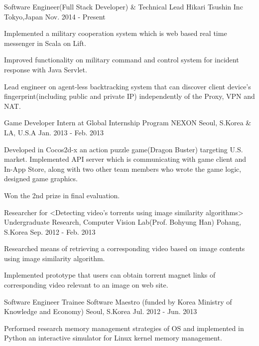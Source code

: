 \begin{cventries}
  \cventry
    {Software Engineer(Full Stack Developer) \& Technical Lead}
    {Hikari Tsushin Inc}
    {Tokyo,Japan}
    {Nov. 2014 - Present}
    {
      \begin{cvitems}
        \item {Implemented a military cooperation system which is web based real time messenger in Scala on Lift.}
        \item {Improved functionality on military command and control system for incident response with Java Servlet.}
        \item {Lead engineer on agent-less backtracking system that can discover client device's fingerprint(including public and private IP) independently of the Proxy, VPN and NAT.}
      \end{cvitems}
    }
  \cventry
    {Game Developer Intern at Global Internship Program}
    {NEXON}
    {Seoul, S.Korea \& LA, U.S.A}
    {Jan. 2013 - Feb. 2013}
    {
      \begin{cvitems}
        \item {Developed in Cocos2d-x an action puzzle game(Dragon Buster) targeting U.S. market. Implemented API server which is communicating with game client and In-App Store, along with two other team members who wrote the game logic, designed game graphics.}
        \item {Won the 2nd prize in final evaluation.}
      \end{cvitems}
    }
  \cventry
    {Researcher for <Detecting video’s torrents using image similarity algorithms>}
    {Undergraduate Research, Computer Vision Lab(Prof. Bohyung Han)}
    {Pohang, S.Korea}
    {Sep. 2012 - Feb. 2013}
    {
      \begin{cvitems}
        \item {Researched means of retrieving a corresponding video based on image contents using image similarity algorithm.}
        \item {Implemented prototype that users can obtain torrent magnet links of corresponding video relevant to an image on web site.}
      \end{cvitems} 
    }
  \cventry
    {Software Engineer Trainee}
    {Software Maestro (funded by Korea Ministry of Knowledge and Economy)}
    {Seoul, S.Korea}
    {Jul. 2012 - Jun. 2013}
    {
      \begin{cvitems}
        \item {Performed research memory management strategies of OS and implemented in Python an interactive simulator for Linux kernel memory management.}

\end{cvitems}}
\end{cventries}
